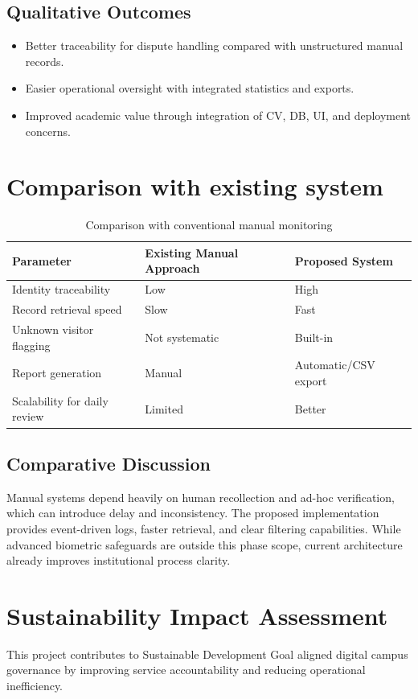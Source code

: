 \documentclass{fisatprojectfinal}
\begin{document}
\subsection*{Qualitative Outcomes}
\begin{itemize}
	\item Better traceability for dispute handling compared with unstructured manual records.
	\item Easier operational oversight with integrated statistics and exports.
	\item Improved academic value through integration of CV, DB, UI, and deployment concerns.
\end{itemize}

\section {Comparison with existing system}
\begin{table}[h!]
\centering
\caption{Comparison with conventional manual monitoring}
\begin{tabular}{|l|l|l|}
\hline
Parameter & Existing Manual Approach & Proposed System \\
\hline
Identity traceability & Low & High \\
\hline
Record retrieval speed & Slow & Fast \\
\hline
Unknown visitor flagging & Not systematic & Built-in \\
\hline
Report generation & Manual & Automatic/CSV export \\
\hline
Scalability for daily review & Limited & Better \\
\hline
\end{tabular}
\end{table}

\subsection*{Comparative Discussion}
Manual systems depend heavily on human recollection and ad-hoc verification, which can introduce delay and inconsistency. The proposed implementation provides event-driven logs, faster retrieval, and clear filtering capabilities. While advanced biometric safeguards are outside this phase scope, current architecture already improves institutional process clarity.

\section{Sustainability Impact Assessment}
This project contributes to Sustainable Development Goal aligned digital campus governance by improving service accountability and reducing operational inefficiency.
\end{document}
